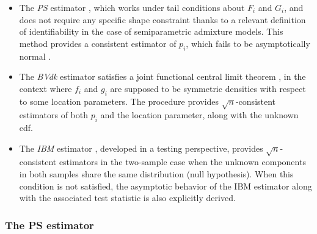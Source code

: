 \begin{itemize}
\item
  The \emph{PS} estimator \citep{Patra+Sen:2016}, which works under tail conditions about \(F_i\) and \(G_i\), and does not require any specific shape constraint thanks to a relevant definition of identifiability in the case of semiparametric admixture models. This method provides a consistent estimator of \(p_i\), which fails to be asymptotically normal \citep[see Theorem 4 in][]{Patra+Sen:2016}.
\item
  The \emph{BVdk} estimator \citep{Bordes+Delmas+Vandekerkhove:2006} satisfies a joint functional central limit theorem \citep[see also][]{Bordes+Vandekerkhove:2010}, in the context where \(f_i\) and \(g_i\) are supposed to be symmetric densities with respect to some location parameters. The procedure provides \(\sqrt{n}\)-consistent estimators of both \(p_i\) and the location parameter, along with the unknown cdf.
\item
  The \emph{IBM} estimator \citep{Milhaud+Pommeret+Salhi+Vandekerkhove:2023}, developed in a testing perspective, provides \(\sqrt{n}\)-consistent estimators in the two-sample case when the unknown components in both samples share the same distribution (null hypothesis). When this condition is not satisfied, the asymptotic behavior of the IBM estimator along with the associated test statistic is also explicitly derived.
\end{itemize}

\subsubsection{The PS estimator}\label{the-ps-estimator}

